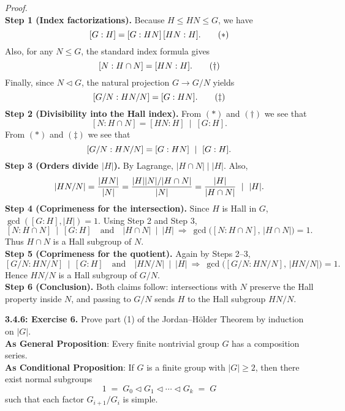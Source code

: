 \documentclass[12pt]{article}
\theoremstyle{definition}
\begin{document}
\dotfill

\emph{Proof.}\\
\textbf{Step 1 (Index factorizations).} Because $H\le HN\le G$, we have
\[
[G:H]=[G:HN]\,[HN:H].\tag{$\ast$}\\
\]
Also, for any $N\le G$, the standard index formula gives
\[
[N:H\cap N]=[HN:H].\tag{$\dagger$}\\
\]
Finally, since $N\lhd G$, the natural projection $G\to G/N$ yields
\[
[G/N:HN/N]=[G:HN].\tag{$\ddagger$}\\
\]
\textbf{Step 2 (Divisibility into the Hall index).} From $(\ast)$ and $(\dagger)$ we see that
\[
[N:H\cap N]=[HN:H]\ \mid\ [G:H].
\]
From $(\ast)$ and $(\ddagger)$ we see that
\[
[G/N:HN/N]=[G:HN]\ \mid\ [G:H].\\
\]
\textbf{Step 3 (Orders divide $|H|$).} By Lagrange, $|H\cap N|\mid |H|$. Also,
\[
|HN/N|=\frac{|HN|}{|N|}=\frac{|H||N|/|H\cap N|}{|N|}=\frac{|H|}{|H\cap N|}\ \mid\ |H|.\\
\]
\textbf{Step 4 (Coprimeness for the intersection).} Since $H$ is Hall in $G$, $\gcd([G:H],|H|)=1$. Using Step 2 and Step 3,
\[
[N:H\cap N]\ \mid\ [G:H]
\quad\text{and}\quad
|H\cap N|\ \mid\ |H|
\ \Rightarrow\
\gcd\!\big([N:H\cap N],\,|H\cap N|\big)=1.
\]
Thus $H\cap N$ is a Hall subgroup of $N$.\\
\textbf{Step 5 (Coprimeness for the quotient).} Again by Steps 2–3,
\[
[G/N:HN/N]\ \mid\ [G:H]
\quad\text{and}\quad
|HN/N|\ \mid\ |H|
\ \Rightarrow\
\gcd\!\big([G/N:HN/N],\,|HN/N|\big)=1.
\]
Hence $HN/N$ is a Hall subgroup of $G/N$.\\
\textbf{Step 6 (Conclusion).} Both claims follow: intersections with $N$ preserve the Hall property inside $N$, and passing to $G/N$ sends $H$ to the Hall subgroup $HN/N$.\\

\newpage

\noindent \textbf{3.4.6: Exercise 6.} Prove part (1) of the Jordan–Hölder Theorem by induction on $|G|$.\\ %

\noindent\textbf{As General Proposition}: Every finite nontrivial group $G$ has a composition series.\\

\noindent \textbf{As Conditional Proposition}: If $G$ is a finite group with $|G|\ge 2$, then there exist normal subgroups
\[
1 \;=\; G_0 \lhd G_1 \lhd \cdots \lhd G_{k} \;=\; G
\]
such that each factor $G_{i+1}/G_i$ is simple.\\
\end{document}
